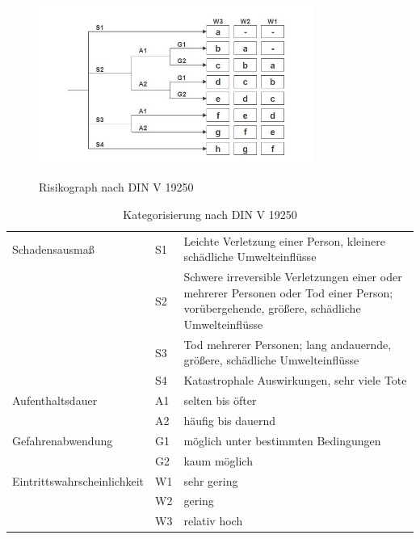 \begin{savenotes}
	\begin{figure}[H]
		\centering
		\includegraphics[width=9cm,height=6cm]{figures/Risikograph}
		\caption[Risikograph nach DIN V 1925]{Risikograph nach DIN V 19250 \parencite[S. 51]{Hillenbrand.2012}}\label{fig:Risikograph}
	\end{figure}
\end{savenotes}

\begin{table}[htpb]
	\scriptsize
	\caption[Kategorisierung nach DIN V 19250]{Kategorisierung nach DIN V 19250 \parencite[S. 52]{Hillenbrand.2012}}\label{tab:Kategorisierung nach DIN V 19250}
	\centering
	\begin{tabular}{l l p{7cm}}
		\toprule
		Schadensausmaß & S1 & Leichte Verletzung einer Person, kleinere schädliche Umwelteinflüsse\\
		 & S2 & Schwere irreversible Verletzungen einer oder mehrerer Personen oder Tod einer Person; vorübergehende, größere, schädliche Umwelteinflüsse\\
		 & S3 & Tod mehrerer Personen; lang andauernde, größere, schädliche Umwelteinflüsse\\
		 & S4 & Katastrophale Auswirkungen, sehr viele Tote\\
		\midrule
		Aufenthaltsdauer & A1 & selten bis öfter\\
		 & A2 & häufig bis dauernd\\
		 \midrule
		 Gefahrenabwendung & G1 & möglich unter bestimmten Bedingungen\\
		 & G2 & kaum möglich\\
		 \midrule
		 Eintrittswahrscheinlichkeit & W1 & sehr gering\\
		 & W2 & gering\\
		 & W3 & relativ hoch\\
		\bottomrule
	\end{tabular}
\end{table}

